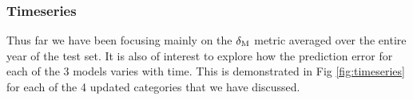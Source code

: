 \documentclass[twocolumn]{article}
\begin{document}
	
	
	
	\subsubsection{Timeseries}\label{sec:timeseries}
	
	
	\noindent Thus far we have been focusing mainly on the $\delta_{\rm M}$ metric averaged over the entire year of the test set. It is also of interest to explore how the prediction error for each of the 3 models varies with time. This is demonstrated in Fig \ref{fig:timeseries} for each of the 4 updated categories that we have discussed. \newline  
	
\end{document}
